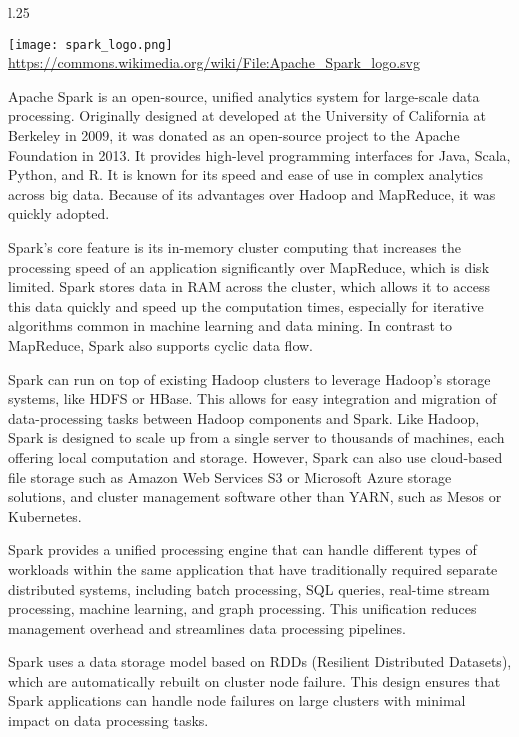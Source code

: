 \begin{wrapfigure}{l}{.25\textwidth}
\begin{center}
\texttt{[image: spark\_logo.png]}
\tiny \url{https://commons.wikimedia.org/wiki/File:Apache_Spark_logo.svg} \normalsize
\end{center}
\end{wrapfigure}
Apache Spark is an open-source, unified analytics system for large-scale data processing. Originally designed at developed at the University of California at Berkeley in 2009, it was donated as an open-source project to the Apache Foundation in 2013. It provides high-level programming interfaces for Java, Scala, Python, and R. It is known for its speed and ease of use in complex analytics across big data. Because of its advantages over Hadoop and MapReduce, it was quickly adopted.

Spark's core feature is its in-memory cluster computing that increases the processing speed of an application significantly over MapReduce, which is disk limited. Spark stores data in RAM across the cluster, which allows it to access this data quickly and speed up the computation times, especially for iterative algorithms common in machine learning and data mining. In contrast to MapReduce, Spark also supports cyclic data flow.

Spark can run on top of existing Hadoop clusters to leverage Hadoop's storage systems, like HDFS or HBase. This allows for easy integration and migration of data-processing tasks between Hadoop components and Spark. Like Hadoop, Spark is designed to scale up from a single server to thousands of machines, each offering local computation and storage. However, Spark can also use cloud-based file storage such as Amazon Web Services S3 or Microsoft Azure storage solutions, and cluster management software other than YARN, such as Mesos or Kubernetes.

Spark provides a unified processing engine that can handle different types of workloads within the same application that have traditionally required separate distributed systems, including batch processing, SQL queries, real-time stream processing, machine learning, and graph processing. This unification reduces management overhead and streamlines data processing pipelines.

Spark uses a data storage model based on RDDs (Resilient Distributed Datasets), which are automatically rebuilt on cluster node failure. This design ensures that Spark applications can handle node failures on large clusters with minimal impact on data processing tasks.

